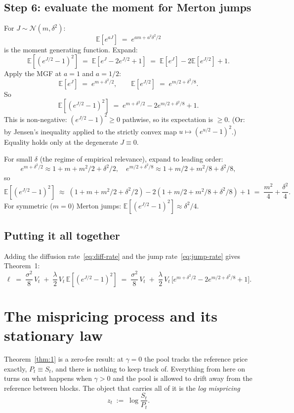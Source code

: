 \documentclass[11pt]{article}
\theoremstyle{definition}
\theoremstyle{remark}
\newcommand{\E}{\mathbb{E}}
\newcommand{\1}{\mathbf{1}}
\begin{document}
\subsection{Step 6: evaluate the moment for Merton jumps}

For $J \sim \mathcal{N}(m, \delta^2)$:
\[
\E[e^{aJ}] \;=\; e^{am + a^2 \delta^2 / 2}
\]
is the moment generating function. Expand:
\[
\E[(e^{J/2} - 1)^2] \;=\; \E[e^J - 2 e^{J/2} + 1] \;=\; \E[e^J] - 2\E[e^{J/2}] + 1.
\]
Apply the MGF at $a = 1$ and $a = 1/2$:
\[
\E[e^J] \;=\; e^{m + \delta^2 / 2}, \qquad \E[e^{J/2}] \;=\; e^{m/2 + \delta^2 / 8}.
\]
So
\begin{equation}\label{eq:merton-moment}
\E[(e^{J/2} - 1)^2] \;=\; e^{m + \delta^2 / 2} - 2 e^{m/2 + \delta^2 / 8} + 1.
\end{equation}
This is non-negative: $(e^{J/2} - 1)^2 \ge 0$ pathwise, so its expectation is $\ge 0$. (Or: by Jensen's inequality applied to the strictly convex map $u \mapsto (e^{u/2} - 1)^2$.) Equality holds only at the degenerate $J \equiv 0$.

For small $\delta$ (the regime of empirical relevance), expand to leading order:
\[
e^{m + \delta^2/2} \approx 1 + m + m^2/2 + \delta^2/2, \quad
e^{m/2 + \delta^2/8} \approx 1 + m/2 + m^2/8 + \delta^2/8,
\]
so
\[
\E[(e^{J/2}-1)^2] \;\approx\; (1 + m + m^2/2 + \delta^2/2) - 2(1 + m/2 + m^2/8 + \delta^2/8) + 1 \;=\; \frac{m^2}{4} + \frac{\delta^2}{4}.
\]
For symmetric ($m = 0$) Merton jumps: $\E[(e^{J/2}-1)^2] \approx \delta^2/4$.

\subsection{Putting it all together}

Adding the diffusion rate~\eqref{eq:diff-rate} and the jump rate~\eqref{eq:jump-rate} gives Theorem~1:
\[
\ell \;=\; \frac{\sigma^2}{8}\,V_t \;+\; \frac{\lambda}{2}\,V_t\,\E[(e^{J/2} - 1)^2] \;=\; \frac{\sigma^2}{8}\,V_t \;+\; \frac{\lambda}{2}\,V_t\,\big[e^{m + \delta^2/2} - 2 e^{m/2 + \delta^2/8} + 1\big].
\]


\section{The mispricing process and its stationary law}\label{sec:stationary}

Theorem~\ref{thm:1} is a zero-fee result: at $\gamma = 0$ the pool tracks the reference price exactly, $P_t \equiv S_t$, and there is nothing to keep track of. Everything from here on turns on what happens when $\gamma > 0$ and the pool is allowed to drift away from the reference between blocks. The object that carries all of it is the \emph{log mispricing}
\begin{equation}\label{eq:zdef}
z_t \;:=\; \log\frac{S_t}{P_t}.
\end{equation}
\end{document}
